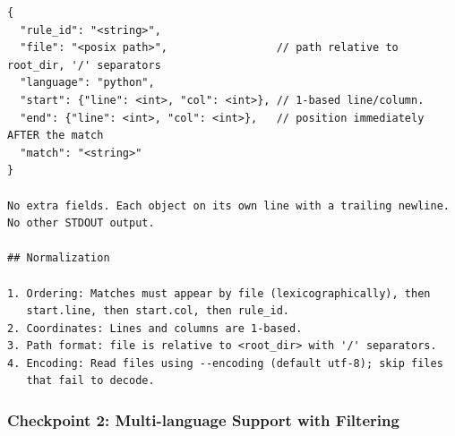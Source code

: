 \begin{lstlisting}[style=specblock, caption={Specification for \texttt{code\_search} checkpoint 1}, label={lst:code-search-cp1}]
{
  "rule_id": "<string>",
  "file": "<posix path>",                 // path relative to root_dir, '/' separators
  "language": "python",
  "start": {"line": <int>, "col": <int>}, // 1-based line/column.
  "end": {"line": <int>, "col": <int>},   // position immediately AFTER the match
  "match": "<string>"
}

No extra fields. Each object on its own line with a trailing newline.
No other STDOUT output.

## Normalization

1. Ordering: Matches must appear by file (lexicographically), then
   start.line, then start.col, then rule_id.
2. Coordinates: Lines and columns are 1-based.
3. Path format: file is relative to <root_dir> with '/' separators.
4. Encoding: Read files using --encoding (default utf-8); skip files
   that fail to decode.
\end{lstlisting}

\subsubsection{Checkpoint 2: Multi-language Support with Filtering}
\label{sec:appendix-cp2}

